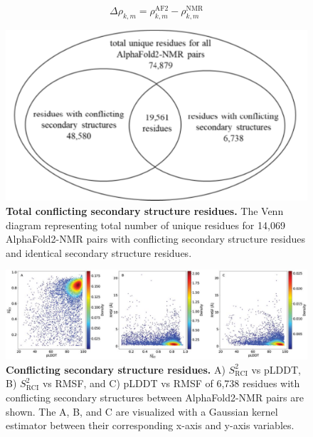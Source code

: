 \begin{equation} \label{eq:supp_plddt:eq5}
\Delta \rho_{k,m} = \rho_{k,m}^{\text{AF2}} - \rho_{k,m}^{\text{NMR}}
\end{equation}


\begin{figure}[H]
    \centering
    \includegraphics[width=\linewidth]{pLDDT//plddt_figures//supplementary_bhawna/supfig24.pdf}
    \caption{\textbf{Total conflicting secondary structure residues.} The Venn diagram representing total number of unique residues for 14,069 AlphaFold2-NMR pairs with conflicting secondary structure residues and identical secondary structure residues.}
    \label{fig:plddt_sup:sup24}
\end{figure}

\begin{figure}[H]
    \centering
    \includegraphics[width=\linewidth]{pLDDT//plddt_figures//supplementary_bhawna/supfig25.pdf}
    \caption{\textbf{Conflicting secondary structure residues.} A) $S_{\text{RCI}}^{2}$ vs pLDDT, B) $S_{\text{RCI}}^{2}$ vs RMSF, and C) pLDDT vs RMSF of 6,738 residues with conflicting secondary structures between AlphaFold2-NMR pairs are shown. The A, B, and C are visualized with a Gaussian kernel estimator between their corresponding x-axis and y-axis variables.}
    \label{fig:plddt_sup:sup25}
\end{figure}

